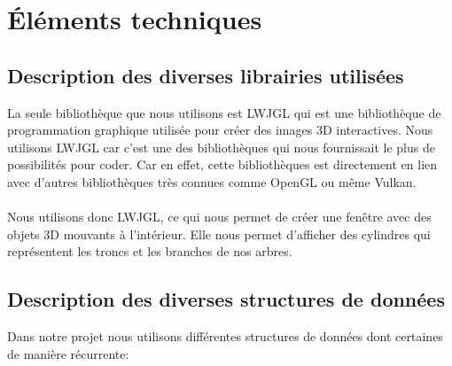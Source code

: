 \documentclass[a4paper,12pt]{article}
\begin{document}
\newpage
\section{Éléments techniques}

\subsection{Description des diverses librairies utilisées}
La seule bibliothèque que nous utilisons est LWJGL qui est une bibliothèque de programmation graphique utilisée pour créer des images 3D interactives. Nous utilisons LWJGL car c'est une des bibliothèques qui nous fournissait le plus de possibilités pour coder. Car en effet, cette bibliothèques est directement en lien avec d'autres bibliothèques très connues comme OpenGL ou même Vulkan. 
\\\\
Nous utilisons donc LWJGL, ce qui nous permet de créer une fenêtre avec des objets 3D mouvants à l'intérieur. Elle nous permet d'afficher des cylindres qui représentent les troncs et les branches de nos arbres. 
\subsection{Description des diverses structures de données}

Dans notre projet nous utilisons différentes structures de données dont certaines de manière récurrente:
\end{document}
